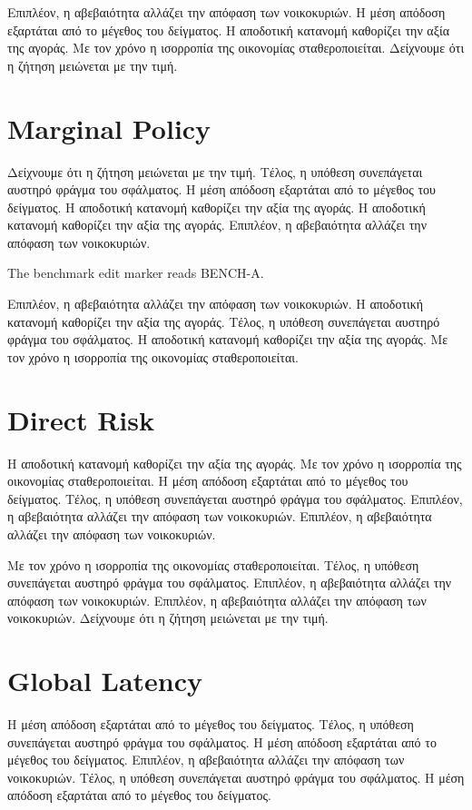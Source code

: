\documentclass[11pt]{article}
\begin{document}
Επιπλέον, η αβεβαιότητα αλλάζει την απόφαση των νοικοκυριών. Η μέση απόδοση εξαρτάται από το μέγεθος του δείγματος. Η αποδοτική κατανομή καθορίζει την αξία της αγοράς. Με τον χρόνο η ισορροπία της οικονομίας σταθεροποιείται. Δείχνουμε ότι η ζήτηση μειώνεται με την τιμή.

\section{Marginal Policy}\label{sec:10}

Δείχνουμε ότι η ζήτηση μειώνεται με την τιμή. Τέλος, η υπόθεση συνεπάγεται αυστηρό φράγμα του σφάλματος. Η μέση απόδοση εξαρτάται από το μέγεθος του δείγματος. Η αποδοτική κατανομή καθορίζει την αξία της αγοράς. Η αποδοτική κατανομή καθορίζει την αξία της αγοράς. Επιπλέον, η αβεβαιότητα αλλάζει την απόφαση των νοικοκυριών.

The benchmark edit marker reads BENCH-A.

Επιπλέον, η αβεβαιότητα αλλάζει την απόφαση των νοικοκυριών. Η αποδοτική κατανομή καθορίζει την αξία της αγοράς. Τέλος, η υπόθεση συνεπάγεται αυστηρό φράγμα του σφάλματος. Η αποδοτική κατανομή καθορίζει την αξία της αγοράς. Με τον χρόνο η ισορροπία της οικονομίας σταθεροποιείται.

\section{Direct Risk}\label{sec:11}

Η αποδοτική κατανομή καθορίζει την αξία της αγοράς. Με τον χρόνο η ισορροπία της οικονομίας σταθεροποιείται. Η μέση απόδοση εξαρτάται από το μέγεθος του δείγματος. Τέλος, η υπόθεση συνεπάγεται αυστηρό φράγμα του σφάλματος. Επιπλέον, η αβεβαιότητα αλλάζει την απόφαση των νοικοκυριών. Επιπλέον, η αβεβαιότητα αλλάζει την απόφαση των νοικοκυριών.

Με τον χρόνο η ισορροπία της οικονομίας σταθεροποιείται. Τέλος, η υπόθεση συνεπάγεται αυστηρό φράγμα του σφάλματος. Επιπλέον, η αβεβαιότητα αλλάζει την απόφαση των νοικοκυριών. Επιπλέον, η αβεβαιότητα αλλάζει την απόφαση των νοικοκυριών. Δείχνουμε ότι η ζήτηση μειώνεται με την τιμή.

\section{Global Latency}\label{sec:12}

Η μέση απόδοση εξαρτάται από το μέγεθος του δείγματος. Τέλος, η υπόθεση συνεπάγεται αυστηρό φράγμα του σφάλματος. Η μέση απόδοση εξαρτάται από το μέγεθος του δείγματος. Επιπλέον, η αβεβαιότητα αλλάζει την απόφαση των νοικοκυριών. Τέλος, η υπόθεση συνεπάγεται αυστηρό φράγμα του σφάλματος. Η μέση απόδοση εξαρτάται από το μέγεθος του δείγματος.
\end{document}
